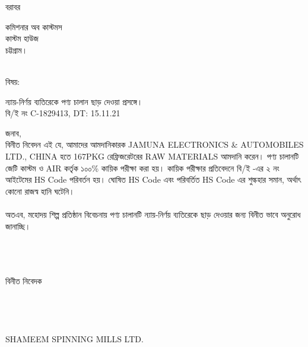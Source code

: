 \documentclass[12pt]{article}
\newcommand{\beno}{C-1829413}
\newcommand{\bedt}{15.11.21}
\newcommand{\co}{CHINA}
\newcommand{\pkg}{167PKG}
\newcommand{\good}{RAW MATERIALS}
\newcommand{\impn}{JAMUNA ELECTRONICS \& AUTOMOBILES LTD.}
\newcommand{\cnfn}{SHAMEEM SPINNING MILLS LTD.}
\begin{document}
\noindent
বরাবর
\\
\begin{minipage}[t]{0.06\linewidth}
\hspace{1em}
\end{minipage}
\begin{minipage}[t]{0.94\linewidth}
কমিশনার অব কাস্টমস
\\
কাস্টম হাউজ
\\
চট্টগ্রাম।
\\
\\
\end{minipage}
\begin{minipage}[t]{0.06\linewidth}
বিষয়:
\end{minipage}
\begin{minipage}[t]{0.94\linewidth}
ন্যায়-নির্ণয় ব্যতিরেকে পণ্য চালান ছাড় দেওয়া প্রসঙ্গে।
\\
বি/ই নং {\beno}, DT: {\bedt}
\\
\end{minipage}
জনাব,
\\
\hspace*{2.7em}বিনীত নিবেদন এই যে, আমাদের আমদানিকারক {\impn},
{\co} হতে {\pkg} রেফ্রিজরেটরের {\good} আমদানি করেন। পণ্য চালানটি জেটি কাস্টম ও AIR কর্তৃক ১০০\% কায়িক পরীক্ষা করা হয়। কায়িক পরীক্ষার প্রতিবেদনে বি/ই -এর ২ নং আইটেমের HS Code পরিবর্তন হয়। ঘোষিত HS Code এবং পরিবর্তিত  HS Code এর শুল্কহার সমান, অর্থাৎ কোনো রাজস্ব হানি ঘটেনি।
\\
\\
অতএব, মহোদয় শিল্প প্রতিষ্ঠান বিবেচনায় পণ্য চালানটি ন্যায়-নির্ণয়
ব্যতিরেকে ছাড় দেওয়ার জন্য বিনীত ভাবে অনুরোধ জানাচ্ছি।
\\
\\
\\
\\
\begin{minipage}[t]{0.50\linewidth}
\hspace{1em}
\end{minipage}
\begin{minipage}[t]{0.60\linewidth}
বিনীত নিবেদক
\\
\\
\\
\\
\\
{\cnfn}
\end{minipage}
\thispagestyle{laststyle}
\end{document}
